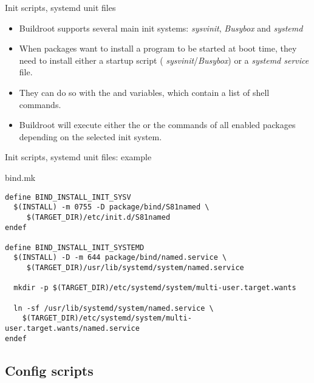 \begin{frame}{Init scripts, systemd unit files}

\begin{itemize}

\item Buildroot supports several main init systems: {\em sysvinit},
  {\em Busybox} and {\em systemd}

\item When packages want to install a program to be started at boot
  time, they need to install either a startup script ({\em
    sysvinit}/{\em Busybox}) or a {\em systemd service} file.

\item They can do so with the  and
   variables, which contain a list of
  shell commands.

\item Buildroot will execute either the 
  or the  commands of all enabled
  packages depending on the selected init system.

\end{itemize}

\end{frame}

\begin{frame}[fragile]{Init scripts, systemd unit files: example}

\begin{block}{bind.mk}
  \begin{verbatim}
define BIND_INSTALL_INIT_SYSV
  $(INSTALL) -m 0755 -D package/bind/S81named \
     $(TARGET_DIR)/etc/init.d/S81named
endef

define BIND_INSTALL_INIT_SYSTEMD
  $(INSTALL) -D -m 644 package/bind/named.service \
     $(TARGET_DIR)/usr/lib/systemd/system/named.service

  mkdir -p $(TARGET_DIR)/etc/systemd/system/multi-user.target.wants

  ln -sf /usr/lib/systemd/system/named.service \
    $(TARGET_DIR)/etc/systemd/system/multi-user.target.wants/named.service
endef
  \end{verbatim}
\end{block}

\end{frame}

\subsection{Config scripts}

